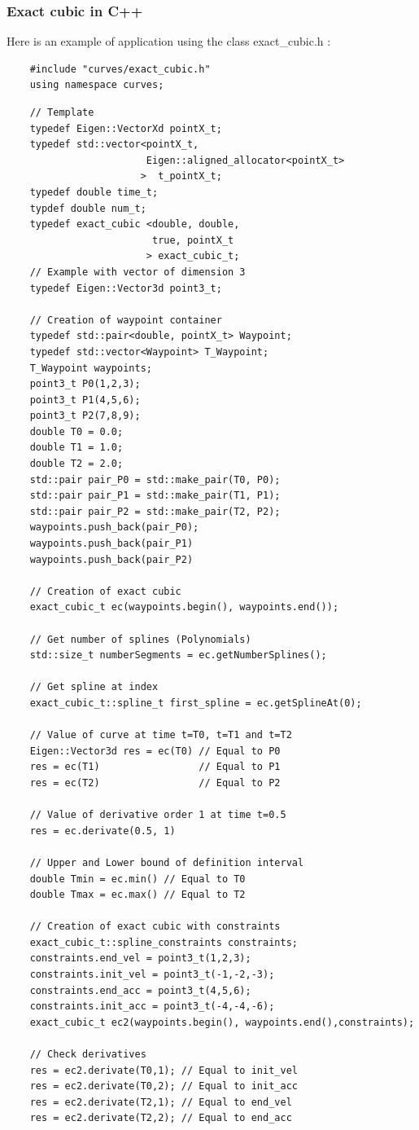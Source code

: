 \documentclass{article}
\begin{document}
    \subsubsection{Exact cubic in C++}
    Here is an example of application using the class exact\_cubic.h :
        
    \begin{lstlisting}
    #include "curves/exact_cubic.h"
    using namespace curves;
    \end{lstlisting}
    \begin{lstlisting}
    // Template
    typedef Eigen::VectorXd pointX_t;
    typedef std::vector<pointX_t,
                        Eigen::aligned_allocator<pointX_t> 
                       >  t_pointX_t;
    typedef double time_t;
    typdef double num_t;
    typedef exact_cubic <double, double, 
                         true, pointX_t
                        > exact_cubic_t;
    // Example with vector of dimension 3
    typedef Eigen::Vector3d point3_t;
    
    // Creation of waypoint container
    typedef std::pair<double, pointX_t> Waypoint;
    typedef std::vector<Waypoint> T_Waypoint;
    T_Waypoint waypoints;
    point3_t P0(1,2,3);
    point3_t P1(4,5,6);
    point3_t P2(7,8,9);
    double T0 = 0.0;
    double T1 = 1.0;
    double T2 = 2.0;
    std::pair pair_P0 = std::make_pair(T0, P0);
    std::pair pair_P1 = std::make_pair(T1, P1);
    std::pair pair_P2 = std::make_pair(T2, P2);
    waypoints.push_back(pair_P0);
    waypoints.push_back(pair_P1)
    waypoints.push_back(pair_P2)
    
    // Creation of exact cubic
    exact_cubic_t ec(waypoints.begin(), waypoints.end());
    
    // Get number of splines (Polynomials)
    std::size_t numberSegments = ec.getNumberSplines();
    
    // Get spline at index
    exact_cubic_t::spline_t first_spline = ec.getSplineAt(0);
    
    // Value of curve at time t=T0, t=T1 and t=T2
    Eigen::Vector3d res = ec(T0) // Equal to P0
    res = ec(T1)                 // Equal to P1
    res = ec(T2)                 // Equal to P2
    
    // Value of derivative order 1 at time t=0.5
    res = ec.derivate(0.5, 1)
    
    // Upper and Lower bound of definition interval
    double Tmin = ec.min() // Equal to T0
    double Tmax = ec.max() // Equal to T2
    
    // Creation of exact cubic with constraints
    exact_cubic_t::spline_constraints constraints;
    constraints.end_vel = point3_t(1,2,3);
    constraints.init_vel = point3_t(-1,-2,-3);
    constraints.end_acc = point3_t(4,5,6);
    constraints.init_acc = point3_t(-4,-4,-6);
    exact_cubic_t ec2(waypoints.begin(), waypoints.end(),constraints);
    
    // Check derivatives
    res = ec2.derivate(T0,1); // Equal to init_vel
    res = ec2.derivate(T0,2); // Equal to init_acc
    res = ec2.derivate(T2,1); // Equal to end_vel
    res = ec2.derivate(T2,2); // Equal to end_acc
    \end{lstlisting}
    
\end{document}

